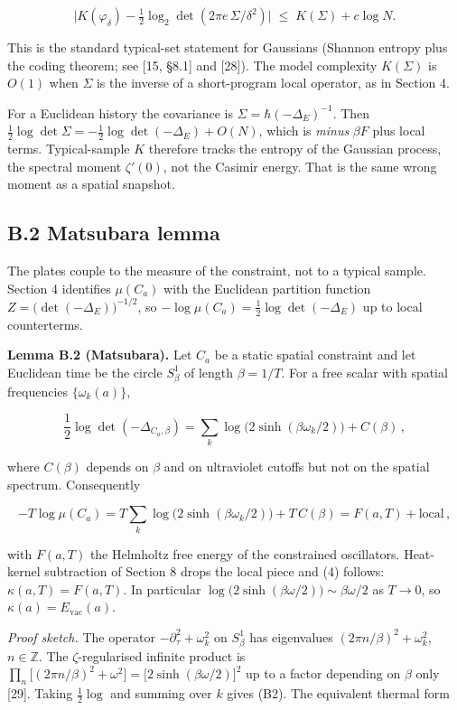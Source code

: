 \documentclass[11pt,letterpaper]{article}
\begin{document}
\[
\bigl\lvert K(\varphi_\delta)-\tfrac12\log_2\det(2\pi e\,\Sigma/\delta^{2})\bigr\rvert
\;\le\; K(\Sigma)+c\log N.
\tag{B1}
\]


This is the standard typical-set statement for Gaussians (Shannon entropy plus the coding theorem; see [15, §8.1] and [28]). The model complexity \(K(\Sigma)\) is \(O(1)\) when \(\Sigma\) is the inverse of a short-program local operator, as in Section 4.


For a Euclidean history the covariance is \(\Sigma=\hbar(-\Delta_E)^{-1}\). Then \(\tfrac12\log\det\Sigma=-\tfrac12\log\det(-\Delta_E)+O(N)\), which is \emph{minus} \(\beta F\) plus local terms. Typical-sample \(K\) therefore tracks the entropy of the Gaussian process, the spectral moment \(\zeta'(0)\), not the Casimir energy. That is the same wrong moment as a spatial snapshot.


\subsection{B.2 Matsubara lemma}


The plates couple to the measure of the constraint, not to a typical sample. Section 4 identifies \(\mu(C_a)\) with the Euclidean partition function \(Z=\bigl(\det(-\Delta_E)\bigr)^{-1/2}\), so \(-\log\mu(C_a)=\tfrac12\log\det(-\Delta_E)\) up to local counterterms.


\textbf{Lemma B.2 (Matsubara).} Let \(C_a\) be a static spatial constraint and let Euclidean time be the circle \(S^1_\beta\) of length \(\beta=1/T\). For a free scalar with spatial frequencies \(\{\omega_k(a)\}\),


\[
\frac12\log\det(-\Delta_{C_a,\beta})
=\sum_k\log\bigl(2\sinh(\beta\omega_k/2)\bigr)+C(\beta)\,,
\tag{B2}
\]


where \(C(\beta)\) depends on \(\beta\) and on ultraviolet cutoffs but not on the spatial spectrum. Consequently


\[
-T\log\mu(C_a)
=T\sum_k\log\bigl(2\sinh(\beta\omega_k/2)\bigr)+T\,C(\beta)
=F(a,T)+\text{local}\,,
\tag{B3}
\]


with \(F(a,T)\) the Helmholtz free energy of the constrained oscillators. Heat-kernel subtraction of Section 8 drops the local piece and (4) follows: \(\kappa(a,T)=F(a,T)\). In particular \(\log\bigl(2\sinh(\beta\omega/2)\bigr)\sim\beta\omega/2\) as \(T\to 0\), so \(\kappa(a)=E_{\mathrm{vac}}(a)\).


\emph{Proof sketch.} The operator \(-\partial_\tau^2+\omega_k^2\) on \(S^1_\beta\) has eigenvalues \((2\pi n/\beta)^2+\omega_k^2\), \(n\in\mathbb{Z}\). The \(\zeta\)-regularised infinite product is \(\prod_n\bigl[(2\pi n/\beta)^2+\omega^2\bigr]=\bigl[2\sinh(\beta\omega/2)\bigr]^2\) up to a factor depending on \(\beta\) only [29]. Taking \(\tfrac12\log\) and summing over \(k\) gives (B2). The equivalent thermal form
\end{document}
